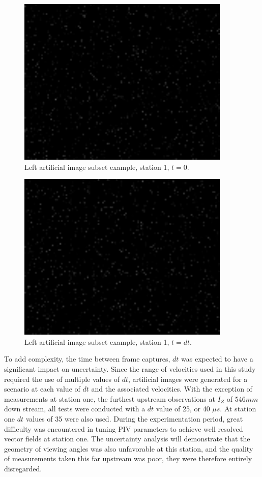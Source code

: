 \begin{figure}[H]
	\centering
	\includegraphics[width=4in]{figs/artificial_images/la}
	\caption{Left artificial image subset example, station 1, $t=0$.}
	\label{fig:la}
\end{figure}

\begin{figure}[H]
	\centering
	\includegraphics[width=4in]{figs/artificial_images/lb}
	\caption{Left artificial image subset example, station 1, $t=dt$.}
	\label{fig:lb}
\end{figure}

To add complexity, the time between frame captures, $dt$ was expected to have a 
significant impact on uncertainty. Since the range of velocities used in this 
study required the use of multiple values of $dt$, artificial images were 
generated for a scenario at each value of $dt$ and the associated velocities. 
With the exception of measurements at station one, the furthest upstream 
observations at $I_Z$ of 546$mm$ down stream, all tests were conducted with a 
$dt$ value of 25, or 40 $\mu s$. At station one $dt$ values of 35 were also 
used. During the experimentation period, great difficulty 
was encountered in tuning PIV parameters to achieve well resolved vector fields 
at station one. The uncertainty analysis will demonstrate that the geometry of 
viewing angles was also unfavorable at this station, and the quality of 
measurements taken this far upstream was poor, they were therefore entirely 
disregarded. 

